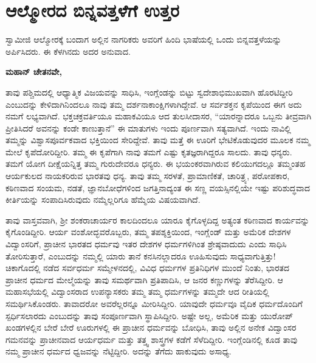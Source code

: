 
\chapter{ಆಲ್ಮೋರದ ಬಿನ್ನವತ್ತಳೆಗೆ ಉತ್ತರ}

ಸ್ವಾಮೀಜಿ ಆಲ್ಮೋರಕ್ಕೆ ಬಂದಾಗ ಅಲ್ಲಿನ ನಾಗರಿಕರು ಅವರಿಗೆ ಹಿಂದಿ ಭಾಷೆಯಲ್ಲಿ ಒಂದು ಬಿನ್ನವತ್ತಳೆಯನ್ನು ಅರ್ಪಿಸಿದರು. ಈ ಕೆಳಗಿನದು ಅದರ ಅನುವಾದ.

\textbf{ಮಹಾನ್​ ಚೇತನವೇ,}

ತಾವು ಪಶ್ಚಿಮದಲ್ಲಿ ಆಧ್ಯಾತ್ಮಿಕ ವಿಜಯವನ್ನು ಸಾಧಿಸಿ, ಇಂಗ್ಲೆಂಡನ್ನು ಬಿಟ್ಟು ಸ್ವದೇಶಾಭಿಮುಖವಾಗಿ ಹೊರಟಿದ್ದೀರಿ ಎಂಬುದನ್ನು ಕೇಳಿದಾಗಿನಿಂದಲೂ ನಾವು ತಮ್ಮ ದರ್ಶನಾಕಾಂಕ್ಷಿಗಳಾಗಿದ್ದೇವೆ. ಆ ಸರ್ವಶಕ್ತನ ಕೃಪೆಯಿಂದ ಈಗ ಅದು ನಮಗೆ ಲಭ್ಯವಾಗಿದೆ. ಭಕ್ತಚಕ್ರವರ್ತಿಯೂ ಮಹಾಕವಿಯೂ ಆದ ತುಲಸೀದಾಸರ, “ಯಾರನ್ನಾದರೂ ಒಬ್ಬನು ತೀವ್ರವಾಗಿ ಪ್ರೀತಿಸಿದರೆ ಅವನನ್ನು ಕಂಡೇ ಕಾಣುತ್ತಾನೆ” ಈ ಮಾತುಗಳು ಇಂದು ಪೂರ್ಣವಾಗಿ ಸತ್ಯವಾಗಿದೆ. ಇಂದು ನಾವಿಲ್ಲಿ ತಮ್ಮನ್ನು ವಿಶ್ವಾಸಪೂರ್ವಕವಾದ ಭಕ್ತಿಯಿಂದ ಸೇರಿದ್ದೇವೆ. ತಾವು ಮತ್ತೆ ಈ ಊರಿಗೆ ಭೇಟಿಕೊಡುವುದರ ಮೂಲಕ ನಮ್ಮ ಮೇಲೆ ಕೃಪೆದೋರಿದ್ದೀರಿ. ತಮ್ಮ ಈ ಕೃಪೆಗಾಗಿ ನಾವು ತಮಗೆ ಎಷ್ಟು ಕೃತಜ್ಞರಾಗಿದ್ದರೂ ಸಾಲದು. ತಾವು ಧನ್ಯರು. ತಮಗೆ ಯೋಗ ದೀಕ್ಷೆಯನ್ನಿತ್ತ ತಮ್ಮ ಗುರುದೇವರೂ ಧನ್ಯರು. ಈ ಭಯಂಕರವಾಗಿರುವ ಕಲಿಯುಗದಲ್ಲೂ ತಮ್ಮಂತಹ ಆರ್ಯಕುಲದ ನಾಯಕರಿರುವ ಭಾರತವು ಧನ್ಯ. ತಾವು ತಮ್ಮ ಸರಳತೆ, ಪ್ರಾಮಾಣಿಕತೆ, ಚಾರಿತ್ರ್ಯ, ಪರೋಪಕಾರ, ಕಠಿಣವಾದ ಸಂಯಮ, ನಡತೆ, ಜ್ಞಾನಬೋಧೆಗಳಿಂದ ಜಗತ್ತಿನಾದ್ಯಂತ ಈ ಸಣ್ಣ ವಯಸ್ಸಿನಲ್ಲಿಯೇ ಇಷ್ಟು ಪರಿಶುದ್ಧವಾದ ಕೀರ್ತಿಯನ್ನು ಸಂಪಾದಿಸಿರುವುದು ನಮ್ಮೆಲ್ಲರಿಗೂ ಹೆಮ್ಮೆಯ ವಿಷಯವಾಗಿದೆ.

ತಾವು ವಾಸ್ತವವಾಗಿ, ಶ‍್ರೀ ಶಂಕರಾಚಾರ್ಯರ ಕಾಲದಿಂದಲೂ ಯಾರೂ ಕೈಗೊಳ್ಳದಿದ್ದ ಅತ್ಯಂತ ಕಠಿಣವಾದ ಕಾರ್ಯವನ್ನು ಕೈಗೊಂಡಿದ್ದೀರಿ. ಆರ್ಯ ವಂಶೋದ್ಭವರೊಬ್ಬರು, ತಮ್ಮ ತಪಶ್ಶಕ್ತಿಯಿಂದ, ಇಂಗ್ಲೆಂಡ್​ ಮತ್ತು ಅಮೆರಿಕ ದೇಶಗಳ ವಿದ್ವಾಂಸರಿಗೆ, ಪ್ರಾಚೀನ ಭಾರತದ ಧರ್ಮವು ಇತರ ದೇಶಗಳ ಧರ್ಮಗಳಿಗಿಂತ ಶ್ರೇಷ್ಠವಾದುದು ಎಂದು ಸಾಧಿಸಿ ತೋರಿಸುತ್ತಾರೆ, ಎಂಬುದನ್ನು ನಮ್ಮಲ್ಲಿ ಯಾರು ತಾನೆ ಕನಸಿನಲ್ಲಾದರೂ ಊಹಿಸುವುದು ಸಾಧ್ಯವಾಗುತ್ತಿತ್ತು! ಚಿಕಾಗೊದಲ್ಲಿ ನಡೆದ ಸರ್ವಧರ್ಮ ಸಮ್ಮೇಳನದಲ್ಲಿ, ವಿವಿಧ ಧರ್ಮಗಳ ಪ್ರತಿನಿಧಿಗಳ ಮುಂದೆ ನಿಂತು, ಭಾರತದ ಪ್ರಾಚೀನ ಧರ್ಮದ ಮೇಲ್ಮೆಯನ್ನು ತಾವು ಸಮರ್ಥವಾಗಿ ಪ್ರತಿಪಾದಿಸಿ, ಆ ಜನರ ಕಣ್ಣುಗಳನ್ನು ತೆರೆಸಿದ್ದೀರಿ. ಆ ಮಹಾಸಭೆಯಲ್ಲಿ ವಿದ್ವಾಂಸರಾದ ಉಪನ್ಯಾಸಕರು ತಮ್ಮ ತಮ್ಮ ಧರ್ಮಗಳನ್ನು ತಮ್ಮದೇ ಆದ ರೀತಿಯಲ್ಲಿ ಸಮರ್ಥಿಸಿಕೊಂಡರು. ತಾವಾದರೋ ಅವರೆಲ್ಲರನ್ನೂ ಮೀರಿಸಿದ್ದೀರಿ. ಯಾವುದೇ ಧರ್ಮವೂ ವೈದಿಕ ಧರ್ಮದೊಂದಿಗೆ ಸ್ಪರ್ಧಿಸಲಾರದು ಎಂಬುದನ್ನು ತಾವು ಸಂಪೂರ್ಣವಾಗಿ ಸ್ಥಾಪಿಸಿದ್ದೀರಿ. ಅಷ್ಟೇ ಅಲ್ಲ, ಅಮೆರಿಕ ಮತ್ತು ಯುರೋಪ್​ ಖಂಡಗಳಲ್ಲಿನ ಬೇರೆ ಬೇರೆ ಊರುಗಳಲ್ಲಿ ಈ ಪ್ರಾಚೀನ ಧರ್ಮವನ್ನು ಬೋಧಿಸಿ, ತಾವು ಅಲ್ಲಿನ ಅನೇಕ ವಿದ್ವಾಂಸರ ಗಮನವನ್ನು ಪ್ರಾಚೀನವಾದ ಆರ್ಯಧರ್ಮ ಮತ್ತು ತತ್ತ್ವ ಶಾಸ್ತ್ರಗಳ ಕಡೆಗೆ ಸೆಳೆದಿದ್ದೀರಿ. ಇಂಗ್ಲೆಂಡಿನಲ್ಲಿ ಕೂಡ ತಾವು ನಮ್ಮ ಪ್ರಾಚೀನ ಧರ್ಮದ ಧ್ವಜವನ್ನು ನೆಟ್ಟಿದ್ದೀರಿ. ಅದನ್ನು ತೆಗೆದು ಹಾಕುವುದು ಅಸಾಧ್ಯ.

